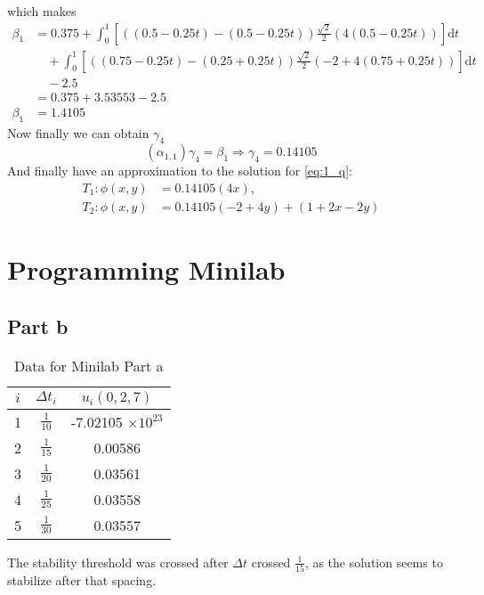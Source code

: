 \documentclass[12pt]{article}
\newcommand{\dd}[1]{\mathrm{d}{#1}}
\begin{document}
which makes 
\begin{equation}
  \label{eq:1_beta_para}
  \begin{aligned}
    \beta_1&= 0.375 +
    \int_0^1\left[((0.5-0.25t)-(0.5-0.25t))\frac{\sqrt{2}}{2}(4(0.5-0.25t))\right]\dd{t} 
    \\ &\quad+
    \int_0^1\left[((0.75-0.25t)-(0.25+0.25t))\frac{\sqrt{2}}{2}(-2+4(0.75+0.25t))\right]\dd{t}
    \\ &\quad- 2.5\\
    &= 0.375 + 3.53553 - 2.5 \\
    \beta_1 &= 1.4105
  \end{aligned}
\end{equation}
Now finally we can obtain $\gamma_4$ 
\begin{equation}
  \label{eq:1_gamma_4}
  (\alpha_{1,1})\gamma_4 = \beta_1 \Rightarrow \gamma_4 = 0.14105
\end{equation}
And finally have an approximation to the solution for \cref{eq:1_q}:
\begin{equation}
  \label{eq:1_approx_t_phi}
  \boxed{
    \begin{aligned}
      T_1:\phi(x,y)&=0.14105(4x), \\
      T_2:\phi(x,y)&=0.14105(-2+4y)+(1+2x-2y)
    \end{aligned}
  }
\end{equation}

\section{Programming Minilab}
\subsection{Part b}
\begin{table}[H]
  \centering
  \begin{tabular}[H]{ccc}
    \hline
    $i$ & $\Delta t_i$ & $u_i(0,2,7)$ \\
    \hline
    1 & $\frac{1}{10}$ & -7.02105 $\times 10^{23}$ \\
    2 & $\frac{1}{15}$ & 0.00586 \\
    3 & $\frac{1}{20}$ & 0.03561 \\
    4 & $\frac{1}{25}$ & 0.03558 \\
    5 & $\frac{1}{30}$ & 0.03557 \\
    \hline
  \end{tabular}
  \caption{Data for Minilab Part a}
  \label{tab:mini_b}
\end{table}
The stability threshold was crossed after $\Delta t$ crossed
$\frac{1}{15}$, as the solution seems to stabilize after that spacing.
\end{document}
